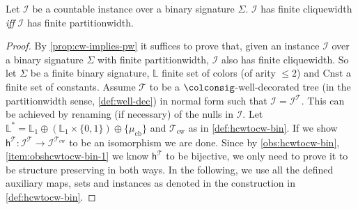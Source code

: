 \documentclass[10pt,a4paper]{amsart}
\theoremstyle{definition}
\numberwithin{equation}{section}
\theoremstyle{plain}
\theoremstyle{definition}
\theoremstyle{myexample}
\theoremstyle{plain}
\newenvironment{customprop}[1]
  {\renewcommand\theinnercustomprop{#1}\innercustomprop}
  {\endinnercustomprop}
\theoremstyle{definition}
\newcommand{\instance}{\mathcal{I}}
\newcommand{\inst}{\instance}
\newcommand{\cols}{\mathbb{L}}
\newcommand{\disun}{\oplus}
\newcommand{\ercwidth}{\partitionwidth}
\newcommand{\partitionwidth}{par\-ti\-tion\-width}
\newcommand{\fcn}[1]{\mathsf{#1}}
\newcommand{\iffi}{\textit{iff} } %
\begin{document}
\begin{customprop}{\ref{th:hcw=cw-bin}}
	Let $\inst$ be a countable instance over a binary signature $\Sigma$.
	$\inst$ has finite cliquewidth \iffi $\inst$ has finite \ercwidth{}.
\end{customprop}
\begin{proof}
	By \cref{prop:cw-implies-pw} it suffices to prove that, given an instance $\inst$ over a binary signature $\Sigma$ with finite \partitionwidth{}, $\inst$ also has finite cliquewidth.
	So let $\Sigma$ be a finite binary signature, $\cols$ finite set of colors (of arity $\le 2$) and $\mathrm{Cnst}$ a finite set of constants. 
	Assume $\mathcal{T}$ to be a $\colconsig$-well-decorated tree (in the \partitionwidth{} sense, \cref{def:well-dec}) in normal form such that $\inst = \inst^{\mathcal{T}}$. This can be achieved by renaming (if necessary) of the nulls in $\inst$. 
	Let $\cols^{\ast} = \cols_1\disun (\cols_1\times \{ 0,1 \})\disun \{ \mu_{\mathrm{cb}}\}$ and $\mathcal{T}_{\mathrm{cw}}$ as in \cref{def:hcwtocw-bin}. If we show $\fcn{h}^{\mathcal{T}}\colon \inst^{\mathcal{T}} \to \inst^{\mathcal{T}_{\mathrm{cw}}}$ to be an isomorphism we are done. Since by \cref{obs:hcwtocw-bin}, \cref{item:obshcwtocw-bin-1} we know $\fcn{h}^{\mathcal{T}}$ to be bijective, we only need to prove it to be structure preserving in both ways. In the following, we use all the defined auxiliary maps, sets and instances as denoted in the construction in \cref{def:hcwtocw-bin}.
	

\end{proof}
\end{document}
